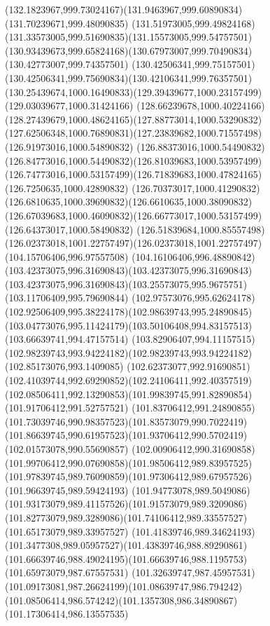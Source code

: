 {{\curveto(132.1823967,999.73024167)(131.9463967,999.60890834)(131.70239671,999.48090835)
\curveto(131.51973005,999.49824168)(131.33573005,999.51690835)(131.15573005,999.54757501)
\curveto(130.93439673,999.65824168)(130.67973007,999.70490834)(130.42773007,999.74357501)
\curveto(130.42506341,999.75157501)(130.42506341,999.75690834)(130.42106341,999.76357501)
\curveto(130.25439674,1000.16490833)(129.39439677,1000.23157499)(129.03039677,1000.31424166)
\curveto(128.66239678,1000.40224166)(128.27439679,1000.48624165)(127.88773014,1000.53290832)
\curveto(127.62506348,1000.76890831)(127.23839682,1000.71557498)(126.91973016,1000.54890832)
\curveto(126.88373016,1000.54490832)(126.84773016,1000.54490832)(126.81039683,1000.53957499)
\curveto(126.74773016,1000.53157499)(126.71839683,1000.47824165)(126.7250635,1000.42890832)
\curveto(126.70373017,1000.41290832)(126.6810635,1000.39690832)(126.6610635,1000.38090832)
\curveto(126.67039683,1000.46090832)(126.66773017,1000.53157499)(126.64373017,1000.58490832)
\curveto(126.51839684,1000.85557498)(126.02373018,1001.22757497)(126.02373018,1001.22757497)
\lineto(104.15706406,996.97557508)
\curveto(104.16106406,996.48890842)(103.42373075,996.31690843)(103.42373075,996.31690843)
\curveto(103.42373075,996.31690843)(103.25573075,995.9675751)(103.11706409,995.79690844)
\curveto(102.97573076,995.62624178)(102.92506409,995.38224178)(102.98639743,995.24890845)
\curveto(103.04773076,995.11424179)(103.50106408,994.83157513)(103.66639741,994.47157514)
\curveto(103.82906407,994.11157515)(102.98239743,993.94224182)(102.98239743,993.94224182)
\lineto(102.85173076,993.1409085)
\curveto(102.62373077,992.91690851)(102.41039744,992.69290852)(102.24106411,992.40357519)
\curveto(102.08506411,992.13290853)(101.99839745,991.82890854)(101.91706412,991.52757521)
\curveto(101.83706412,991.24890855)(101.73039746,990.98357523)(101.83573079,990.7022419)
\curveto(101.86639745,990.61957523)(101.93706412,990.5702419)(102.01573078,990.55690857)
\curveto(102.00906412,990.31690858)(101.99706412,990.07690858)(101.98506412,989.83957525)
\curveto(101.97839745,989.76090859)(101.97306412,989.67957526)(101.96639745,989.59424193)
\curveto(101.94773078,989.5049086)(101.93173079,989.41157526)(101.91573079,989.3209086)
\curveto(101.82773079,989.3289086)(101.74106412,989.33557527)(101.65173079,989.33957527)
\curveto(101.41839746,989.34624193)(101.3477308,989.05957527)(101.43839746,988.89290861)
\curveto(101.66639746,988.49024195)(101.66639746,988.1195753)(101.65973079,987.67557531)
\curveto(101.32639747,987.45957531)(101.09173081,987.26624199)(101.08639747,986.794242)
\curveto(101.08506414,986.574242)(101.1357308,986.34890867)(101.17306414,986.13557535)
}}
